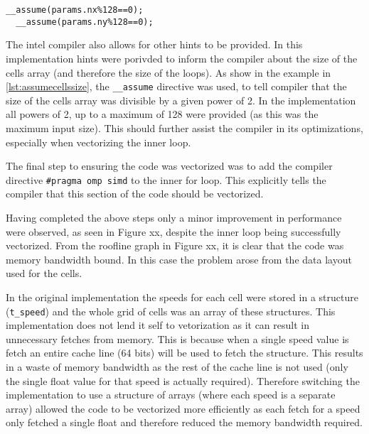 \documentclass{article}
\begin{document}
\begin{multicols}{2}
\begin{lstlisting}[style=CStyle, label={lst:assumecellssize}, caption={Additional compiler hints},]
  __assume(params.nx%128==0);
  __assume(params.ny%128==0);
\end{lstlisting}

The intel compiler also allows for other hints to be provided. In this
implementation hints were porivded to inform the compiler about the size of the
cells array (and therefore the size of the loops). As show in the example in
\autoref{lst:assumecellssize}, the \verb|__assume| directive was used, to tell
compiler that the size of the cells array was divisible by a given power of 2.
In the implementation all powers of 2, up to a maximum of 128 were provided (as
this was the maximum input size). This should further assist the compiler in
its optimizations, especially when vectorizing the inner loop.

The final step to ensuring the code was vectorized was to add the compiler
directive \verb|#pragma omp simd| to the inner for loop. This explicitly tells
the compiler that this section of the code should be vectorized. 

Having completed the above steps only a minor improvement in performance were
observed, as seen in Figure xx, despite the inner loop being successfully
vectorized. From the roofline graph in Figure xx, it is clear that the code was
memory bandwidth bound. In this case the problem arose from the data layout used for the cells.

In the original implementation the speeds for each cell were stored in a
structure (\verb|t_speed|) and the whole grid of cells was an array of these
structures. This implementation does not lend it self to vetorization as it
can result in unnecessary fetches from memory. This is because when a single
speed value is fetch an entire cache line (64 bits) will be used to fetch the
structure. This results in a waste of memory bandwidth as the rest of the
cache line is not used (only the single float value for that speed is actually
required). Therefore switching the implementation to use a structure of arrays
(where each speed is a separate array) allowed the code to be vectorized more
efficiently as each fetch for a speed only fetched a single float and therefore
reduced the memory bandwidth required. 



\end{multicols}
\end{document}
